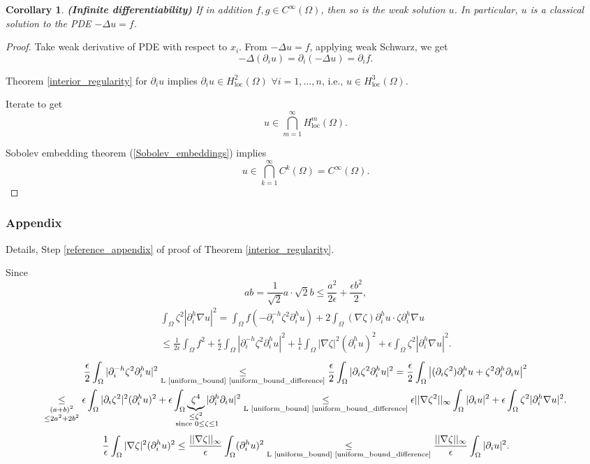 \documentclass[12pt]{article}
\newtheorem{corollary}{Corollary}[section]
\theoremstyle{definition}
\begin{document}
\begin{corollary}
\emph{\textbf{(Infinite differentiability)}} If in addition $f,g\in C^\infty(\Omega)$, then so is the weak solution $u$. In particular, $u$ is a classical solution to the PDE $-\Delta u=f$.
\end{corollary}

\begin{proof}
Take weak derivative of PDE with respect to $x_i$. From $-\Delta u=f$, applying weak Schwarz, we get
\[-\Delta(\partial_iu)=\partial_i(-\Delta u)=\partial_if.\]

Theorem \ref{interior_regularity} for $\partial_iu$ implies $\partial_iu\in H_\text{loc}^2(\Omega)$ $\forall i=1,\ldots,n$, i.e., $u\in H_\text{loc}^3(\Omega)$.

Iterate to get
\[u\in\bigcap_{m=1}^\infty H_\text{loc}^m(\Omega).\]

Sobolev embedding theorem (\ref{Sobolev_embeddings}) implies
\[u\in\bigcap_{k=1}^\infty C^k(\Omega)=C^\infty(\Omega).\]
\end{proof}

\subsubsection*{Appendix}
Details, Step \ref{reference_appendix} of proof of Theorem \ref{interior_regularity}.

Since
\[ab=\frac1{\sqrt2}a\cdot\sqrt2b\leq\frac{a^2}{2\epsilon}+\frac{\epsilon b^2}2,\]
\begin{multline*}
\int_\Omega\zeta^2|\partial_i^h\nabla u|^2=\int_\Omega f(-\partial_i^{-h}\zeta^2\partial_i^hu)+2\int_\Omega(\nabla\zeta)\partial_i^hu\cdot\zeta\partial_i^h\nabla u\\
\leq\frac1{2\epsilon}\int_\Omega f^2+\frac\epsilon2\int_\Omega|\partial_i^{-h}\zeta^2\partial_i^hu|^2+\frac1\epsilon\int_\Omega|\nabla\zeta|^2(\partial_i^hu)^2+\epsilon\int_\Omega\zeta^2|\partial_i^h\nabla u|^2.
\end{multline*}
\begin{multline*}
\frac\epsilon2\int_\Omega|\partial_i^{-h}\zeta^2\partial_i^hu|^2\underset{\text{L \ref{uniform_bound} \ref{uniform_bound_difference}}}\leq\frac\epsilon2\int_\Omega|\partial_i\zeta^2\partial_i^hu|^2=\frac\epsilon2\int_\Omega\big|(\partial_i\zeta^2)\partial_i^hu+\zeta^2\partial_i^h\partial_iu\big|^2\\
\underset{\substack{(a+b)^2\\\leq2a^2+2b^2}}\leq\epsilon\int_\Omega|\partial_i\zeta^2|^2(\partial_i^hu)^2+\epsilon\int_\Omega\underbrace{\zeta^4}_{\mathclap{\substack{\leq\zeta^2\\\text{ since }0\leq\zeta\leq1}}}|\partial_i^h\partial_iu|^2\underset{\text{L \ref{uniform_bound} \ref{uniform_bound_difference}}}\leq\epsilon||\nabla\zeta^2||_\infty\int_\Omega|\partial_iu|^2+\epsilon\int_\Omega\zeta^2|\partial_i^h\nabla u|^2.
\end{multline*}
\[\frac1\epsilon\int_\Omega|\nabla\zeta|^2(\partial_i^hu)^2\leq\frac{||\nabla\zeta||_\infty}\epsilon\int_\Omega(\partial_i^hu)^2\underset{\text{L \ref{uniform_bound} \ref{uniform_bound_difference}}}\leq\frac{||\nabla\zeta||_\infty}\epsilon\int_\Omega|\partial_iu|^2.\]
\end{document}
